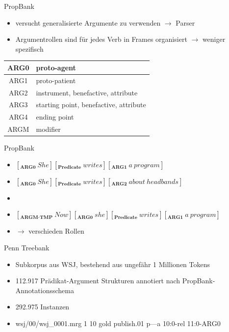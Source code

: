 \documentclass[10pt]{beamer}
\begin{document}
\begin{frame}{PropBank}
  \begin{itemize}
   \item versucht generalisierte Argumente zu verwenden $\rightarrow$ Parser
   \item Argumentrollen sind für jedes Verb in Frames organisiert $\rightarrow$ weniger spezifisch
  \end{itemize}
  
	\begin{table}
	\centering
	\begin{tabular}{|c|l|}
	\hline 
	ARG0 & proto-agent \\ 
	\hline 
	ARG1 & proto-patient \\ 
	\hline 
	ARG2 & instrument, benefactive, attribute \\ 
	\hline 
	ARG3 & starting point, benefactive, attribute \\ 
	\hline 
	ARG4 & ending point \\ 
	\hline 
	ARGM & modifier \\ 
	\hline 
	\end{tabular}
	\end{table}

\end{frame}

\begin{frame}{PropBank}
	
	\begin{itemize}
		
		\item $ [_{\textbf{ARG0}}\ She][_{\textbf{Predicate}}\ writes][_{\textbf{ARG1}}\ a\ program] $ 
		\item $ [_{\textbf{ARG0}}\ She][_{\textbf{Predicate}}\ writes][_{\textbf{ARG2}}\ about\ headbands] $
		\item {}
		\item $ [_{\textbf{ARGM-TMP}}\ Now][_{\textbf{ARG0}}\ she][_{\textbf{Predicate}}\ writes][_{\textbf{ARG1}}\ a\ program] $ 
		\item $ \rightarrow $ verschieden Rollen
		
	\end{itemize}
\end{frame}


\begin{frame}{Penn Treebank}
  \begin{itemize}
   \item Subkorpus aus WSJ, bestehend aus ungefähr 1 Millionen Tokens
   \item 112.917 Prädikat-Argument Strukturen annotiert nach PropBank-Annotationsschema
   \item 292.975 Instanzen
   \item \footnotesize{ wsj/00/wsj\_0001.mrg 1 10 gold publish.01 p---a 10:0-rel 11:0-ARG0}
          
  \end{itemize}
  
\end{frame}
\end{document}
